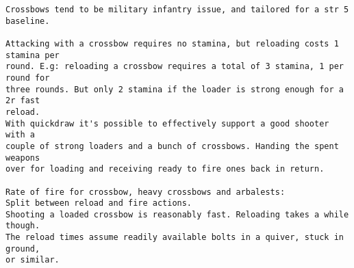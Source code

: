 \goodbreak \small \begin{samepage} \begin{verbatim}
Crossbows tend to be military infantry issue, and tailored for a str 5 baseline.

Attacking with a crossbow requires no stamina, but reloading costs 1 stamina per 
round. E.g: reloading a crossbow requires a total of 3 stamina, 1 per round for
three rounds. But only 2 stamina if the loader is strong enough for a 2r fast 
reload.
With quickdraw it's possible to effectively support a good shooter with a 
couple of strong loaders and a bunch of crossbows. Handing the spent weapons
over for loading and receiving ready to fire ones back in return.

Rate of fire for crossbow, heavy crossbows and arbalests:
Split between reload and fire actions.
Shooting a loaded crossbow is reasonably fast. Reloading takes a while though.
The reload times assume readily available bolts in a quiver, stuck in ground, 
or similar.


\end{verbatim}
\end{samepage}
